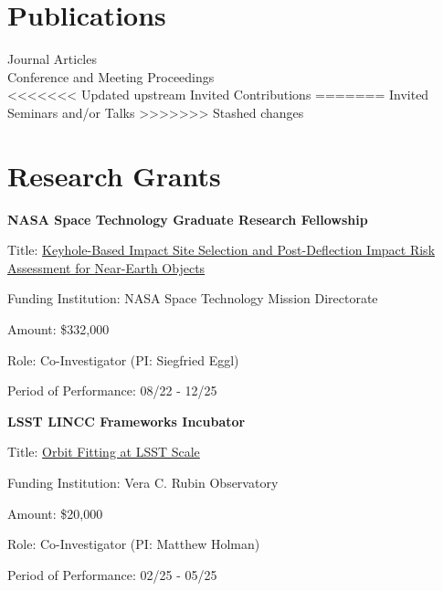 \documentclass[margin,line]{res}
\newlength{\myitemspacing}
\newenvironment{list_new}{
    \begin{list}{\scriptsize{$\bullet$}}{%
        \setlength{\itemsep}{0in}
        \setlength{\parsep}{\myitemspacing} \setlength{\parskip}{0in}
        \setlength{\topsep}{0in} \setlength{\partopsep}{0in} 
        \setlength{\leftmargin}{0.2in}
        }}
    {\end{list}
}
\begin{document}
\begin{resume}
\section{\sc Publications}
 Journal Articles\\
 Conference and Meeting Proceedings\\
<<<<<<< Updated upstream
 Invited Contributions
=======
 Invited Seminars and/or Talks
>>>>>>> Stashed changes

\section{\sc Research Grants}
{\bf NASA Space Technology Graduate Research Fellowship}
\begin{list_new}
    \item Title: \href{https://techport.nasa.gov/projects/118462}{Keyhole-Based Impact Site Selection and Post-Deflection Impact Risk Assessment for Near-Earth Objects}
    \item Funding Institution: NASA Space Technology Mission Directorate
    \item Amount: \$332,000
    \item Role: Co-Investigator (PI: Siegfried Eggl)
    \item Period of Performance: 08/22 - 12/25
\end{list_new}

{\bf LSST LINCC Frameworks Incubator}
\begin{list_new}
    \item Title: \href{https://lsstdiscoveryalliance.org/programs/lincc-frameworks/incubator-awardees/#holman}{Orbit Fitting at LSST Scale}
    \item Funding Institution: Vera C. Rubin Observatory
    \item Amount: \$20,000 %
    \item Role: Co-Investigator (PI: Matthew Holman)
    \item Period of Performance: 02/25 - 05/25
\end{list_new}


\end{resume}
\end{document}
